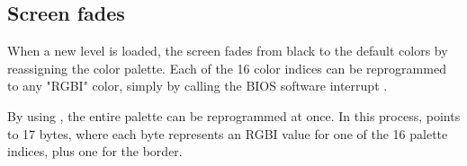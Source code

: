 \documentclass[book.tex]{subfiles}
\begin{document}
\subsection{Screen fades}
When a new level is loaded, the screen fades from black to the default colors by reassigning the color palette. Each of the 16 color indices can be reprogrammed to any "RGBI" color, simply by calling the BIOS software interrupt .\\

\par
\begin{minipage}{\textwidth}
  
\end{minipage}
\label{ega_set_palette}

\par
By using , the entire palette can be reprogrammed at once. In this process,  points to 17 bytes, where each byte represents an RGBI value for one of the 16 palette indices, plus one for the border.
\end{document}
